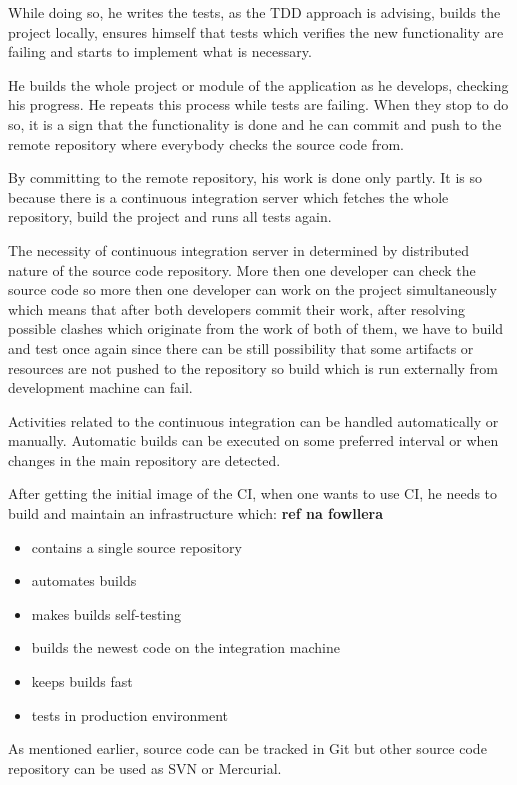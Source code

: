 \documentclass[12pt,final,oneside]{fithesis}
\begin{document}
While doing so, he writes the tests, as the TDD approach is advising, builds the project locally, ensures himself that tests which verifies the new functionality are failing and starts to implement what is necessary.

He builds the whole project or module of the application as he develops, checking his progress. He repeats this process while tests are failing. When they stop to do so, it is a sign that the functionality is done and he can commit and push to the remote repository where everybody checks the source code from.

By committing to the remote repository, his work is done only partly. It is so because there is a continuous integration server which fetches the whole repository, build the project and runs all tests again.

The necessity of continuous integration server in determined by distributed nature of the source code repository. More then one developer can check the source code so more then one developer can work on the project simultaneously which means that after both developers commit their work, after resolving possible clashes which originate from the work of both of them, we have to build and test once again since there can be still possibility that some artifacts or resources are not pushed to the repository so build which is run externally from development machine can fail.

Activities related to the continuous integration can be handled automatically or manually. Automatic builds can be executed on some preferred interval or when changes in the main repository are detected.

After getting the initial image of the CI, when one wants to use CI, he needs to build and maintain an infrastructure which: \textbf{ref na fowllera}

\begin{itemize}
	\item{contains a single source repository}
	\item{automates builds}
	\item{makes builds self-testing}
	\item{builds the newest code on the integration machine}
	\item{keeps builds fast}
	\item{tests in production environment}
\end{itemize}

As mentioned earlier, source code can be tracked in Git but other source code repository can be used as SVN or Mercurial.
\end{document}
